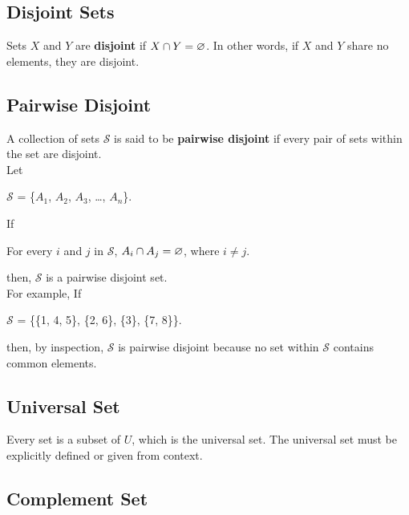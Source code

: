 \subsection*{Disjoint Sets}

Sets $X$ and $Y$ are \textbf{disjoint} if $X \cap Y = \varnothing$.  In other words, if $X$ and $Y$ share no elements, they are disjoint.

\subsection*{Pairwise Disjoint}

A collection of sets $\mathcal{S}$ is said to be \textbf{pairwise disjoint} if every pair of sets within the set are disjoint.\\

Let

\begin{center}
    $\mathcal{S}$ = \{$A_1$, $A_2$, $A_3$, \dots, $A_n$\}.
\end{center}

If

\begin{center}
    For every $i$ and $j$ in $\mathcal{S}$, $A_i \cap A_j = \varnothing$, where $i \neq j$.
\end{center}

then, $\mathcal{S}$ is a pairwise disjoint set.\\

For example, If

\begin{center}
    $\mathcal{S}$ = \{\{1, 4, 5\}, \{2, 6\}, \{3\}, \{7, 8\}\}.
\end{center}

then, by inspection, $\mathcal{S}$ is pairwise disjoint because no set within $\mathcal{S}$ contains common elements.

\subsection*{Universal Set}

Every set is a subset of $U$, which is the universal set.  The universal set must be explicitly defined or given from context.

\clearpage

\subsection*{Complement Set}

